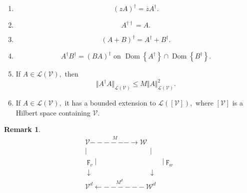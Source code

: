 \documentclass[aps,preprint]{revtex4}%
\newtheorem{remark}[theorem]{Remark}
\begin{document}
\begin{enumerate}
\item
\begin{equation}
\left(  zA\right)  ^{\dagger}=\overline{z}A^{\dagger}.
\end{equation}


\item
\begin{equation}
A^{\dagger\dagger}=A.
\end{equation}


\item
\begin{equation}
\left(  A+B\right)  ^{\dagger}=A^{\dagger}+B^{\dagger}.
\end{equation}


\item
\begin{equation}
A^{\dagger}B^{\dagger}=\left(  BA\right)  ^{\dagger}\text{ on }%
\operatorname*{Dom}\left\{  A^{\dagger}\right\}  \cap\operatorname*{Dom}%
\left\{  B^{\dagger}\right\}  .
\end{equation}


\item If $A\in\mathcal{L}\left(  \mathcal{V}\right)  ,$ then
\begin{equation}
\Vert A^{\dagger}A\Vert_{\mathcal{L}\left(  \mathcal{V}\right)  }\leq M\Vert
A\Vert_{\mathcal{L}\left(  \mathcal{V}\right)  }^{2}.
\end{equation}


\item If $A\in\mathcal{L}\left(  \mathcal{V}\right)  ,$ it has a bounded
extension to $\mathcal{L}\left(  [\mathcal{V}]\right)  ,$ where $[\mathcal{V}%
]$ is a Hilbert space containing $\mathcal{V}.$
\end{enumerate}

\begin{remark}%
\begin{gather}
\mathcal{V}\overset{M}{------\rightarrow}\mathcal{W}\\
\left\vert \qquad\quad\qquad\qquad\qquad\right\vert \\
\digamma_{v}\left\vert \qquad\quad\quad\quad\qquad\,\,\qquad\right\vert
\digamma_{w}\\
\downarrow\quad\qquad\qquad\quad\qquad\downarrow\,\\
\mathcal{V}^{d}\overset{M^{d}}{\longleftarrow------}\mathcal{W}^{d}%
\end{gather}

\end{remark}
\end{document}
